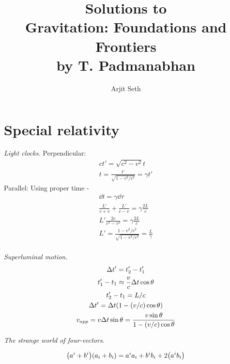 \documentclass{report}
\begin{document}
\title{Solutions to \\ Gravitation: Foundations and Frontiers \\ by T. Padmanabhan}

\author{Arjit Seth}
\date{}

\maketitle

\chapter{Special relativity}


\begin{subquests}
	\item \emph{Light clocks.}
	Perpendicular:
	\begin{gather*}
		ct' = \sqrt{c^2 - v^2}t \\
		t = \frac{t'}{\sqrt{1 - v^2/c^2}} = \gamma t'
	\end{gather*}
	Parallel: Using proper time -
	\begin{gather*}
		\dd{t} = \gamma\dd{\tau} \\ 
		\frac{L'}{c+v} + \frac{L'}{c-v} = \gamma\frac{2L}{c} \\
		L'\frac{2c}{c^2 - v^2}  = \gamma\frac{2L}{c} \\
		L' = \frac{1-v^2/c^2}{\sqrt{1-v^2/c^2}} = \frac{L}{\gamma} \\
	\end{gather*}

	\item \emph{Superluminal motion.}
	\begin{gather*}
		\Delta t' = t_2' - t_1' \\
		t_1' - t_1 \approx \frac{v}{c}\Delta t \cos\theta \\
		t_2' - t_1 = L/c \\
		\Delta t' = \Delta t\pqty{1-(v/c)\cos\theta} \\
		v_{app} = v\Delta t \sin\theta = \frac{v\sin\theta}{1-(v/c)\cos\theta}
	\end{gather*}

	\item \emph{The strange world of four-vectors.}
	\begin{subquests}
		\item
		\begin{gather*}
			\pqty{a^i + b^i}\pqty{a_i + b_i} = a^i a_i + b^i b_i + 2\pqty{a^i b_i}
		\end{gather*}
	\end{subquests}


\end{subquests}
\end{document}
